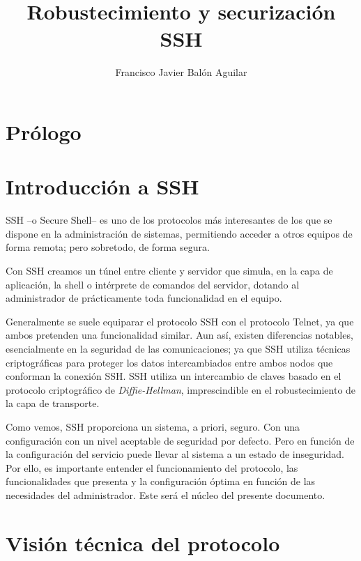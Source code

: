 \documentclass[a4paper, 11pt, titlepage]{article}
\title{Robustecimiento y securización SSH}
\author{Francisco Javier Balón Aguilar}
\begin{document}
\maketitle
\renewcommand{\contentsname}{Índice}
\tableofcontents
\newpage

\section*{Prólogo}
\newpage

\section{Introducción a SSH}

    SSH --o Secure Shell-- es uno de los protocolos más interesantes de los que se dispone 
    en la administración de sistemas, permitiendo acceder a otros equipos de forma remota; 
    pero sobretodo, de forma segura.
    
    Con SSH creamos un túnel entre cliente y servidor que simula, en la capa de aplicación, 
    la shell o intérprete de comandos del servidor, dotando al administrador de prácticamente 
    toda funcionalidad en el equipo.

    Generalmente se suele equiparar el protocolo SSH con el protocolo Telnet, ya que ambos 
    pretenden una funcionalidad similar. Aun así, existen diferencias notables, esencialmente 
    en la seguridad de las comunicaciones; ya que SSH utiliza técnicas criptográficas para 
    proteger los datos intercambiados entre ambos nodos que conforman la conexión SSH. SSH 
    utiliza un intercambio de claves basado en el protocolo criptográfico de \textit{Diffie-Hellman}, 
    imprescindible en el robustecimiento de la capa de transporte.

    Como vemos, SSH proporciona un sistema, a priori, seguro. Con una configuración con un 
    nivel aceptable de seguridad por defecto. Pero en función de la configuración del 
    servicio puede llevar al sistema a un estado de inseguridad. Por ello, es importante 
    entender el funcionamiento del protocolo, las funcionalidades que presenta y la configuración
    óptima en función de las necesidades del administrador. Este será el núcleo del presente 
    documento.

\section{Visión técnica del protocolo}
\end{document}
